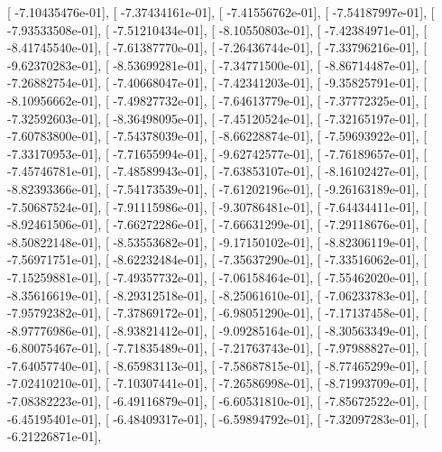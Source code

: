 \documentclass{article}
\begin{document}
       [ -7.10435476e-01],
       [ -7.37434161e-01],
       [ -7.41556762e-01],
       [ -7.54187997e-01],
       [ -7.93533508e-01],
       [ -7.51210434e-01],
       [ -8.10550803e-01],
       [ -7.42384971e-01],
       [ -8.41745540e-01],
       [ -7.61387770e-01],
       [ -7.26436744e-01],
       [ -7.33796216e-01],
       [ -9.62370283e-01],
       [ -8.53699281e-01],
       [ -7.34771500e-01],
       [ -8.86714487e-01],
       [ -7.26882754e-01],
       [ -7.40668047e-01],
       [ -7.42341203e-01],
       [ -9.35825791e-01],
       [ -8.10956662e-01],
       [ -7.49827732e-01],
       [ -7.64613779e-01],
       [ -7.37772325e-01],
       [ -7.32592603e-01],
       [ -8.36498095e-01],
       [ -7.45120524e-01],
       [ -7.32165197e-01],
       [ -7.60783800e-01],
       [ -7.54378039e-01],
       [ -8.66228874e-01],
       [ -7.59693922e-01],
       [ -7.33170953e-01],
       [ -7.71655994e-01],
       [ -9.62742577e-01],
       [ -7.76189657e-01],
       [ -7.45746781e-01],
       [ -7.48589943e-01],
       [ -7.63853107e-01],
       [ -8.16102427e-01],
       [ -8.82393366e-01],
       [ -7.54173539e-01],
       [ -7.61202196e-01],
       [ -9.26163189e-01],
       [ -7.50687524e-01],
       [ -7.91115986e-01],
       [ -9.30786481e-01],
       [ -7.64434411e-01],
       [ -8.92461506e-01],
       [ -7.66272286e-01],
       [ -7.66631299e-01],
       [ -7.29118676e-01],
       [ -8.50822148e-01],
       [ -8.53553682e-01],
       [ -9.17150102e-01],
       [ -8.82306119e-01],
       [ -7.56971751e-01],
       [ -8.62232484e-01],
       [ -7.35637290e-01],
       [ -7.33516062e-01],
       [ -7.15259881e-01],
       [ -7.49357732e-01],
       [ -7.06158464e-01],
       [ -7.55462020e-01],
       [ -8.35616619e-01],
       [ -8.29312518e-01],
       [ -8.25061610e-01],
       [ -7.06233783e-01],
       [ -7.95792382e-01],
       [ -7.37869172e-01],
       [ -6.98051290e-01],
       [ -7.17137458e-01],
       [ -8.97776986e-01],
       [ -8.93821412e-01],
       [ -9.09285164e-01],
       [ -8.30563349e-01],
       [ -6.80075467e-01],
       [ -7.71835489e-01],
       [ -7.21763743e-01],
       [ -7.97988827e-01],
       [ -7.64057740e-01],
       [ -8.65983113e-01],
       [ -7.58687815e-01],
       [ -8.77465299e-01],
       [ -7.02410210e-01],
       [ -7.10307441e-01],
       [ -7.26586998e-01],
       [ -8.71993709e-01],
       [ -7.08382223e-01],
       [ -6.49116879e-01],
       [ -6.60531810e-01],
       [ -7.85672522e-01],
       [ -6.45195401e-01],
       [ -6.48409317e-01],
       [ -6.59894792e-01],
       [ -7.32097283e-01],
       [ -6.21226871e-01],
\end{document}
